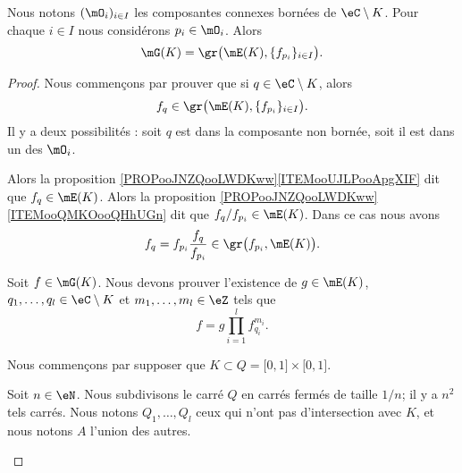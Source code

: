 \begin{lemma}     \label{LEMooEJRMooNJhMov}
	Nous notons \( (\mO_i)_{i\in I}\) les composantes connexes bornées de \( \eC\setminus K\). Pour chaque \( i\in I\) nous considérons \( p_i\in\mO_i\). Alors
	\begin{equation}
		\mG(K)=\gr\big( \mE(K),\{ f_{p_i} \}_{i\in I} \big).
	\end{equation}
\end{lemma}

\begin{proof}
	Nous commençons par prouver que si \( q\in\eC\setminus K\), alors
	\begin{equation}
		f_q\in\gr\big( \mE(K),\{ f_{p_i} \}_{i\in I} \big).
	\end{equation}
	Il y a deux possibilités : soit \( q\) est dans la composante non bornée, soit il est dans un des \( \mO_i\).
	\begin{subproof}
		Alors la proposition \ref{PROPooJNZQooLWDKww}\ref{ITEMooUJLPooApgXIF} dit que \( f_q\in\mE(K)\).
		\spitem[Si \( q\in\mO_i\)]
		Alors la proposition \ref{PROPooJNZQooLWDKww}\ref{ITEMooQMKOooQHhUGn} dit que \( f_q/f_{p_i}\in\mE(K)\). Dans ce cas nous avons
		\begin{equation}
			f_q=f_{p_i}\frac{ f_q }{ f_{p_i} }\in\gr\big( f_{p_i},\mE(K) \big).
		\end{equation}
	\end{subproof}
	Soit \( f\in\mG(K)\). Nous devons prouver l'existence de \( g\in\mE(K)\), \( q_1,\ldots, q_l\in\eC\setminus K\) et \( m_1,\ldots, m_l\in \eZ\) tels que
	\begin{equation}
		f=g\prod_{i=1}^lf_{q_i}^{m_i}.
	\end{equation}

	Nous commençons par supposer que \( K\subset Q=\mathopen[ 0 , 1 \mathclose]\times\mathopen[ 0 , 1 \mathclose]\).
	\begin{subproof}
		\spitem[Les petits carrés]
		Soit \( n\in \eN\). Nous subdivisons le carré \( Q\) en carrés fermés de taille \( 1/n\); il y a \( n^2\) tels carrés. Nous notons \( Q_1,\ldots, Q_l\) ceux qui n'ont pas d'intersection avec \( K\), et nous notons \( A\) l'union des autres.


\end{subproof}
\end{proof}
